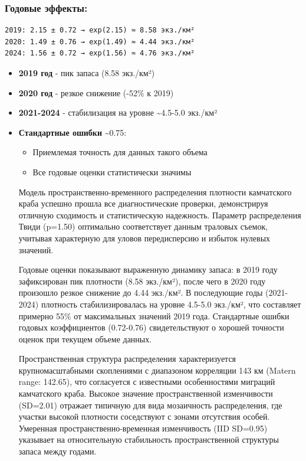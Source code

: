 \documentclass[
  letterpaper,
  DIV=11,
  numbers=noendperiod]{scrreprt}
\begin{document}
\subsubsection{\texorpdfstring{\textbf{Годовые
эффекты:}}{Годовые эффекты:}}\label{ux433ux43eux434ux43eux432ux44bux435-ux44dux444ux444ux435ux43aux442ux44b}

\begin{verbatim}
2019: 2.15 ± 0.72 → exp(2.15) ≈ 8.58 экз./км²
2020: 1.49 ± 0.76 → exp(1.49) ≈ 4.44 экз./км²
2024: 1.56 ± 0.72 → exp(1.56) ≈ 4.76 экз./км²
\end{verbatim}

\begin{itemize}
\item
  \textbf{2019 год} - пик запаса (8.58 экз./км²)
\item
  \textbf{2020 год} - резкое снижение (-52\% к 2019)
\item
  \textbf{2021-2024} - стабилизация на уровне \textasciitilde4.5-5.0
  экз./км²
\item
  \textbf{Стандартные ошибки} \textasciitilde0.75:

  \begin{itemize}
  \item
    Приемлемая точность для данных такого объема
  \item
    Все годовые оценки статистически значимы
  \end{itemize}

  Модель пространственно-временного распределения плотности камчатского
  краба успешно прошла все диагностические проверки, демонстрируя
  отличную сходимость и статистическую надежность. Параметр
  распределения Твиди (p=1.50) оптимально соответствует данным траловых
  съемок, учитывая характерную для уловов передисперсию и избыток
  нулевых значений.

  Годовые оценки показывают выраженную динамику запаса: в 2019 году
  зафиксирован пик плотности (8.58 экз./км²), после чего в 2020 году
  произошло резкое снижение до 4.44 экз./км². В последующие годы
  (2021-2024) плотность стабилизировалась на уровне 4.5-5.0 экз./км²,
  что составляет примерно 55\% от максимальных значений 2019 года.
  Стандартные ошибки годовых коэффициентов (0.72-0.76) свидетельствуют о
  хорошей точности оценок при текущем объеме данных.

  Пространственная структура распределения характеризуется
  крупномасштабными скоплениями с диапазоном корреляции 143 км (Matern
  range: 142.65), что согласуется с известными особенностями миграций
  камчатского краба. Высокое значение пространственной изменчивости
  (SD=2.01) отражает типичную для вида мозаичность распределения, где
  участки высокой плотности соседствуют с зонами отсутствия особей.
  Умеренная пространственно-временная изменчивость (IID SD=0.95)
  указывает на относительную стабильность пространственной структуры
  запаса между годами.


\end{itemize}
\end{document}
